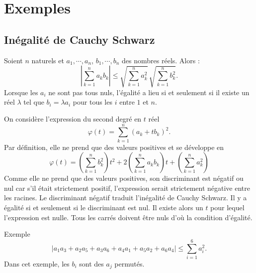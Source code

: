 \section{Exemples}
\subsection{Inégalité de Cauchy Schwarz}
\begin{prop}
 Soient $n$ naturels et $a_1,\cdots,a_n$, $b_1,\cdots,b_n$ des nombres réels. Alors :
\begin{displaymath}
 \left\vert \sum_{k=1}^n a_kb_k\right\vert \leq
\sqrt{\sum_{k=1}^na_k^2} \,\sqrt{\sum_{k=1}^nb_k^2}.
\end{displaymath}
Lorsque les $a_i$ ne sont pas tous nuls, l'égalité a lieu si et seulement si il existe un réel $\lambda$ tel que $b_i=\lambda a_i$ pour tous les $i$ entre $1$ et $n$.
\end{prop}
\begin{demo}
On considère l'expression du second degré en $t$ réel
\begin{displaymath}
 \varphi(t) = \sum_{k=1}^n(a_k+tb_k)^2.
\end{displaymath}
Par définition, elle ne prend que des valeurs positives et se développe en
\begin{displaymath}
 \varphi(t) = \left( \sum_{k=1}^nb_k^2\right)t^2 + 2\left( \sum_{k=1}^na_kb_k\right)t + \left( \sum_{k=1}^na_k^2\right) 
\end{displaymath}
Comme elle ne prend que des valeurs positives, son discriminant est négatif ou nul car s'il était strictement positif, l'expression serait strictement négative entre les racines. Le discriminant négatif traduit l'inégalité de Cauchy Schwarz.\newline
Il y a égalité si et seulement si le discriminant est nul. Il existe alors un $t$ pour lequel l'expression est nulle. Tous les carrés doivent être nuls d'où la condition d'égalité.
\end{demo}
Exemple
\begin{displaymath}
 \left\vert a_1 a_3 + a_2 a_5 +a_3 a_6 + a_4 a_1 + a_5 a_2  + a_6 a_4 \right \vert \leq \sum_{i=1}^6 a_i^2.
\end{displaymath}
Dans cet exemple, les $b_i$ sont des $a_j$ permutés.

